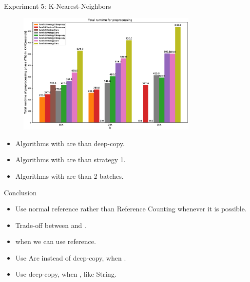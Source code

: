 \documentclass[9pt]{beamer}
\begin{document}
\begin{frame}[fragile]{Experiment 5: K-Nearest-Neighbors}

    \begin{figure}[hp]
        \centering
        \begin{center}
                \includegraphics[width=0.8\textwidth]{images/preprocessing.eps}
                \captionsetup{labelformat=empty}
        \end{center}
    \end{figure}
    \begin{itemize} 
        \item Algorithms with  are  than deep-copy. 
        \item Algorithms with  are  than strategy 1.
        \item Algorithms with  are  than 2 batches.
    \end{itemize}
\end{frame}


\begin{frame}[fragile]{Conclusion}
    \begin{itemize} 
        \item Use normal reference rather than Reference Counting whenever it is possible.
        \item Trade-off between  and .
        \item {} when we can use reference.
        \item Use Arc instead of deep-copy, when .
        \item Use deep-copy, when , like String.
    \end{itemize}
\end{frame}   
\end{document}
